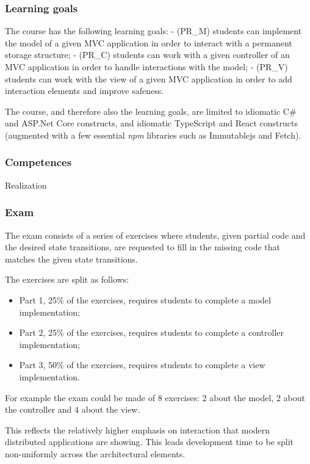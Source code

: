     \subsubsection{Learning goals}\label{learning-goals}

The course has the following learning goals: - (PR\_M) students can
implement the model of a given MVC application in order to interact with
a permanent storage structure; - (PR\_C) students can work with a given
controller of an MVC application in order to handle interactions with
the model; - (PR\_V) students can work with the view of a given MVC
application in order to add interaction elements and improve safeness.

The course, and therefore also the learning goals, are limited to
idiomatic C\# and ASP.Net Core constructs, and idiomatic TypeScript and
React constructs (augmented with a few essential \emph{npm} libraries
such as Immutablejs and Fetch).

\subsubsection{Competences}\label{competences}
  Realization


    \subsubsection{Exam}\label{exam}

The exam consists of a series of exercises where students, given partial
code and the desired state transitions, are requested to fill in the
missing code that matches the given state transitions.

The exercises are split as follows: 
\begin{itemize}
\item Part 1, 25\% of the exercises, requires students to complete a model implementation; 
\item Part 2, 25\% of the exercises, requires students to complete a controller implementation; 
\item Part 3, 50\% of the exercises, requires students to complete a view implementation.
\end{itemize}

For example the exam could be made of 8 exercises: 2 about the model, 2
about the controller and 4 about the view.

This reflects the relatively higher emphasis on interaction that modern
distributed applications are showing. This leads development time to be
split non-uniformly across the architectural elements.

